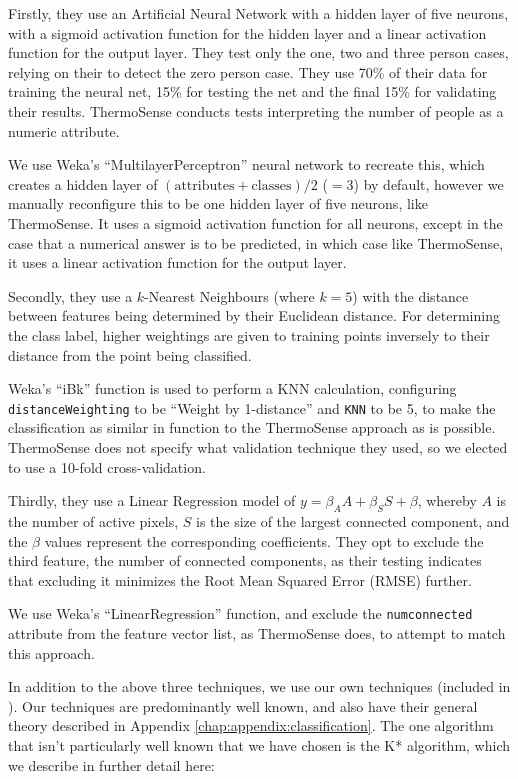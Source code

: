 \documentclass[../thesis/thesis.tex]{subfiles}
\begin{document}
Firstly, they use an Artificial Neural Network with a hidden layer of five neurons, with a sigmoid activation function for the hidden layer and a linear activation function for the output layer. They test only the one, two and three person cases, relying on their \pir to detect the zero person case. They use 70\% of their data for training the neural net, 15\% for testing the net and the final 15\% for validating their results. ThermoSense conducts tests interpreting the number of people as a numeric attribute.

We use Weka's ``MultilayerPerceptron'' neural network to recreate this, which creates a hidden layer of $(\mathrm{attributes} + \mathrm{classes}) / 2$ ($= 3$) by default, however we manually reconfigure this to be one hidden layer of five neurons, like ThermoSense. It uses a sigmoid activation function for all neurons, except in the case that a numerical answer is to be predicted, in which case like ThermoSense, it uses a linear activation function for the output layer.

Secondly, they use a $k$-Nearest Neighbours (where $k=5$) with the distance between features being determined by their Euclidean distance. For determining the class label, higher weightings are given to training points inversely to their distance from the point being classified.

Weka's ``iBk'' function is used to perform a KNN calculation, configuring \texttt{distanceWeighting} to be ``Weight by 1-distance'' and \texttt{KNN} to be 5, to make the classification as similar in function to the ThermoSense approach as is possible. ThermoSense does not specify what validation technique they used, so we elected to use a 10-fold cross-validation.

Thirdly, they use a Linear Regression model of $y = \beta_A A + \beta_S S + \beta $, whereby $A$ is the number of active pixels, $S$ is the size of the largest connected component, and the $\beta$ values represent the corresponding coefficients. They opt to exclude the third feature, the number of connected components, as their testing indicates that excluding it minimizes the Root Mean Squared Error (RMSE) further. 

We use Weka's ``LinearRegression'' function, and exclude the \texttt{numconnected} attribute from the feature vector list, as ThermoSense does, to attempt to match this approach.

In addition to the above three techniques, we use our own techniques (included in ). Our techniques are predominantly well known, and also have their general theory described in Appendix \ref{chap:appendix:classification}. The one algorithm that isn't particularly well known that we have chosen is the K* algorithm, which we describe in further detail here:
\end{document}
